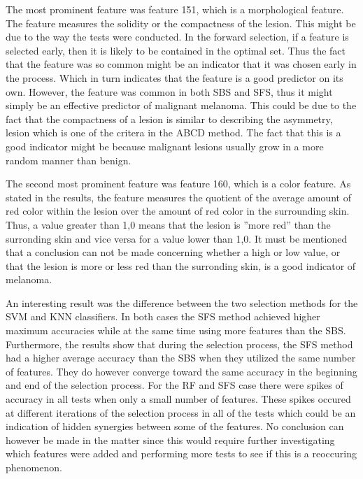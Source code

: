 \documentclass{kththesis}
\begin{document}
The most prominent feature was feature 151, which is a morphological feature. The feature measures the solidity or the compactness of the lesion. This might be due to the way the tests were conducted. In the forward selection, if a feature is selected early, then it is likely to be contained in the optimal set. Thus the fact that the feature was so common might be an indicator that it was chosen early in the process. Which in turn indicates that the feature is a good predictor on its own. However, the feature was common in both SBS and SFS, thus it might simply be an effective predictor of malignant melanoma. This could be due to the fact that the compactness of a lesion is similar to describing the asymmetry, lesion which is one of the critera in the ABCD method. The fact that this is a good indicator might be because malignant lesions usually grow in a more random manner than benign.

The second most prominent feature was feature 160, which is a color feature. As stated in the results, the feature measures the quotient of the average amount of red color within the lesion over the amount of red color in the surrounding skin. Thus, a value greater than 1,0 means that the lesion is ''more red'' than the surronding skin and vice versa for a value lower than 1,0. It must be mentioned that a conclusion can not be made concerning whether a high or low value, or that the lesion is more or less red than the surronding skin, is a good indicator of melanoma.

An interesting result was the difference between the two selection methods for the SVM and KNN classifiers. In both cases the SFS method achieved higher maximum accuracies while at the same time using more features than the SBS. Furthermore, the results  show that during the selection process, the SFS method had a higher average accuracy than the SBS when they utilized the same number of features. They do however converge toward the same accuracy in the beginning and end of the selection process. For the RF and SFS case there were spikes of accuracy in all tests when only a small number of features. These spikes occured at different iterations of the selection process in all of the tests which could be an indication of hidden synergies between some of the features. No conclusion can however be made in the matter since this would require further investigating which features were added and performing more tests to see if this is a reoccuring phenomenon.
\end{document}
